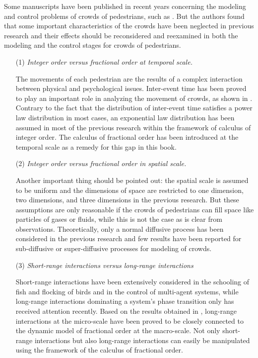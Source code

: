 \documentclass[]{chencao}
\begin{document}
Some manuscripts have been published in recent years concerning the
modeling and control problems of crowds of pedestrians, such as
\cite{1.AlfioQuarteroni2003,1.Haken2006,1.Thalmann2007,1.WolframW.F2008,1.Bellomo2008a,1.Kachroo2008b,1.Pelechano2008,1.Timmermans2009,1.Kachroo2009,1.Barcelo2010}.
But the authors found that some important characteristics of the crowds
have been neglected in previous research and their effects should be
reconsidered and reexamined in both the modeling and the control stages
for crowds of pedestrians.
%
\begin{enumerate}
\item[(1)] \textit{Integer order versus fractional order at temporal scale.}

The movements of each pedestrian are the results of a complex
interaction between physical and psychological issues. Inter-event time
has been proved to play an important role in analyzing the movement of
crowds, as shown in \cite{1.BruceJ.West2014}. Contrary to the fact that
the distribution of inter-event time satisfies a power law distribution
in most cases, an exponential law distribution has been assumed in most
of the previous research within the framework of calculus of integer
order. The calculus of fractional
order has been introduced at the temporal scale as a remedy for this gap
in this book.
\item[(2)] \textit{Integer order versus fractional order in spatial scale.}

Another important thing should be pointed out: the spatial scale is
assumed to be uniform and the dimensions of space are restricted to one
dimension, two dimensions, and three dimensions in the previous
research. But these assumptions are only reasonable if the crowds of
pedestrians can fill space like particles of gases or fluids, while this
is not the case as is clear from observations. Theoretically, only a
normal diffusive process has been considered in the previous research
and few results have been reported for sub-diffusive or super-diffusive
processes for modeling of crowds.
\item[(3)] \textit{Short-range interactions versus long-range interactions}

Short-range interactions have been extensively considered in the
schooling of fish and flocking of birds and in the control of
multi-agent systems, while long-range interactions dominating a system's
phase transition only has received attention recently. Based on the
results obtained in \cite{1.Ishiwata2012}, long-range interactions at
the micro-scale have been proved to be closely connected to the dynamic
model of fractional order at the macro-scale. Not only short-range
interactions but also long-range interactions can easily be manipulated
using the framework of the  calculus
of fractional order.
\end{enumerate}
\end{document}
